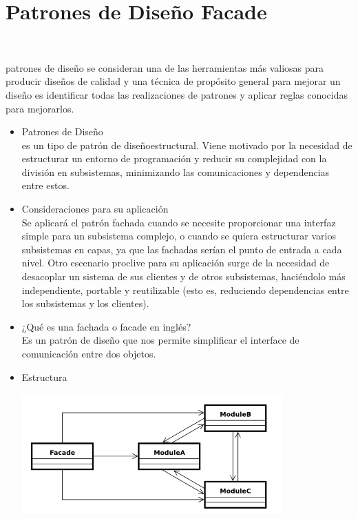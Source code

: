 \section{Patrones de Diseño Facade} 
\textbf{}\\
\begin{flushleft}
patrones de diseño se consideran una de las herramientas más valiosas para producir diseños de calidad y una técnica de propósito general para mejorar un diseño es identificar todas las realizaciones de patrones y aplicar reglas conocidas para mejorarlos.

\begin{itemize}
	\item Patrones de Diseño
	\\es un tipo de patrón de diseñoestructural. Viene motivado por la necesidad de estructurar un entorno de
programación y reducir su complejidad con la división en subsistemas, minimizando las comunicaciones y dependencias
entre estos.

     \item Consideraciones para su aplicación
  \\Se aplicará el patrón fachada cuando se necesite proporcionar una interfaz simple para un subsistema complejo, o cuando se quiera estructurar varios subsistemas en capas, ya que las fachadas
serían el punto de entrada a cada nivel. Otro escenario proclive para su aplicación surge de la necesidad de desacoplar un sistema de sus clientes y de otros subsistemas, haciéndolo más
independiente, portable y reutilizable (esto es, reduciendo dependencias entre los subsistemas y los clientes).


	


	\item ¿Qué es una fachada o facade en inglés?
	\\ Es un patrón de diseño que nos permite simplificar el interface de comunicación entre dos objetos.

\item Estructura
	\begin{center}
	\includegraphics[width=10cm]{./Imagenes/facade1} 
	\end{center}


\end{itemize}
\end{flushleft}
